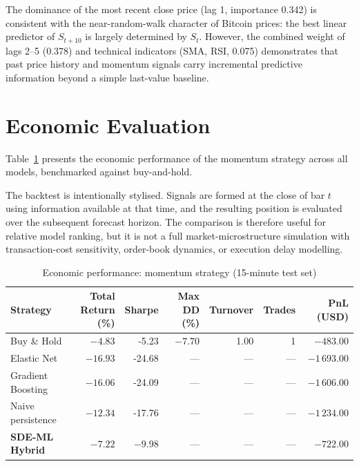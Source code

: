 \documentclass[12pt, a4paper, oneside]{report}
\theoremstyle{plain}
\theoremstyle{definition}
\theoremstyle{remark}
\begin{document}
The dominance of the most recent close price (lag 1, importance 0.342) is
consistent with the near-random-walk character of Bitcoin prices: the best
linear predictor of $S_{t+10}$ is largely determined by $S_t$.  However, the
combined weight of lags 2--5 (0.378) and technical indicators (SMA, RSI, 0.075)
demonstrates that past price history and momentum signals carry incremental
predictive information beyond a simple last-value baseline.

\section{Economic Evaluation}

Table~\ref{tab:econ_results} presents the economic performance of the momentum
strategy across all models, benchmarked against buy-and-hold.

The backtest is intentionally stylised.  Signals are formed at the close of bar
$t$ using information available at that time, and the resulting position is
evaluated over the subsequent forecast horizon.  The comparison is therefore
useful for relative model ranking, but it is not a full market-microstructure
simulation with transaction-cost sensitivity, order-book dynamics, or execution
delay modelling.

\begin{table}[H]
\begin{singlespace}
\fontsize{10}{11}\selectfont
\caption{Economic performance: momentum strategy (15-minute test set)}
\label{tab:econ_results}
\begin{tabular}{@{}lrrrrrr@{}}
\toprule
Strategy & Total Return (\%) & Sharpe & Max DD (\%) & Turnover & Trades & PnL (USD) \\
\midrule
Buy \& Hold              & $-4.83$ & -5.23 & $-7.70$ & 1.00 & 1 & $-483.00$ \\
Elastic Net              & $-16.93$ & -24.68 & --- & --- & --- & $-1\,693.00$ \\
Gradient Boosting        & $-16.06$ & -24.09 & --- & --- & --- & $-1\,606.00$ \\
Naive persistence        & $-12.34$ & -17.76 & --- & --- & --- & $-1\,234.00$ \\
\textbf{SDE-ML Hybrid}   & $\mathbf{-7.22}$ & $\mathbf{-9.98}$ & --- & --- & --- & $\mathbf{-722.00}$ \\
\bottomrule
\end{tabular}
\end{singlespace}
\end{table}
\end{document}
